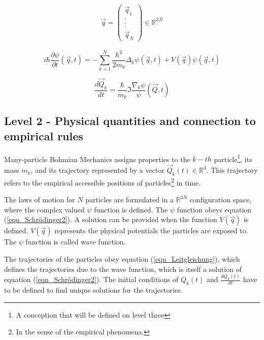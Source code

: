 \documentclass{article}
\begin{document}
\begin{eqnarray}
\vec q = \left( \begin{array}{c} \vec q_1 \\ . \\ . \\ . \\ \vec q_N \end{array} \right) \in \mathbb{R}^{3N}
\end{eqnarray}

\begin{equation}
i\hbar \frac{\partial \psi}{\partial t}(\vec q,t)=-\sum_{k=1}^{N} \frac{\hbar^2}{2m_k}\Delta_k \psi(\vec q,t)+V(\vec q)\psi(\vec q,t) 
\label{eqn_Schrödinger2}
\end{equation}

\begin{equation}
\frac{d\vec Q_k}{dt}=\frac{\hbar}{m_k}\Im \frac{\nabla_k\psi}{\psi}(\vec Q,t) 
\label{eqn_Leitgleichung}
\end{equation}

\newpage

\subsection*{Level 2 - Physical quantities and connection to empirical rules}

Many-particle Bohmian Mechanics assigns properties to the $k-th$ particle\footnote{A conception that will be defined on level three}, its mass $m_k$, and its trajectory represented by a vector $\vec Q_k(t) \in \mathbb{R}^3 $. This trajectory refers to the empirical accessible positions of particles\footnote{In the sense of the empirical phenomena.} in time. \newline

The laws of motion for $N$ particles are formulated in a $\mathbb{R}^{3N}$ configuration space, where the complex valued $\psi$ function is defined. The $\psi$ function obeys equation (\ref{eqn_Schrödinger2}). A solution can be provided when the function $V(\vec q)$ is defined. $V(\vec q)$ represents the physical potentials the particles are exposed to. The $\psi$ function is called wave function.

The trajectories of the particles obey equation (\ref{eqn_Leitgleichung}), which defines the trajectories due to the wave function, which is itself a solution of equation (\ref{eqn_Schrödinger2}). The initial conditions of $Q_k(t)$ and $\frac{dQ_k(t)}{dt}$ have to be defined to find unique solutions for the trajectories. \newline
\end{document}
